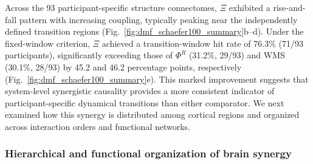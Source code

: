 \documentclass[fleqn,10pt]{wlscirep}
\newcommand{\rev}[1]{\textcolor{red}{#1}}
\theoremstyle{naturetheorem}
\begin{document}

Across the 93 participant-specific structure connectomes, $\Xi$ exhibited a rise-and-fall pattern with increasing coupling, typically peaking near the independently defined transition regions (Fig.~\ref{fig:dmf_schaefer100_summary}b--d). Under the fixed-window criterion, $\Xi$ achieved a transition-window hit rate of 76.3\% (71/93 participants), significantly exceeding those of $\Phi^R$ (31.2\%, 29/93) and WMS (30.1\%, 28/93) by 45.2 and 46.2 percentage points, respectively (Fig.~\ref{fig:dmf_schaefer100_summary}e). This marked improvement suggests that system-level synergistic causality provides a more consistent indicator of participant-specific dynamical transitions than either comparator. We next examined how this synergy is distributed among cortical regions and organized across interaction orders and functional networks.


\subsubsection*{Hierarchical and functional organization of brain synergy}

\end{document}
